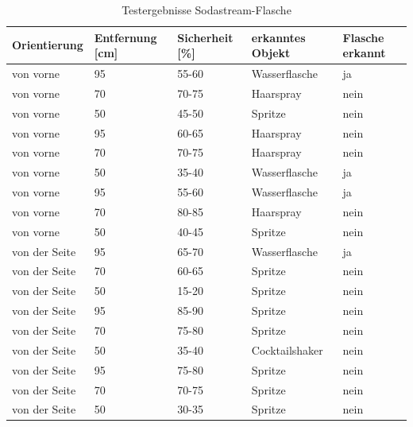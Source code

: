 \begin{table} [H]
	\centering
	\begin{tabular} {l l l l l}
		Orientierung & Entfernung [cm] & Sicherheit [\%] & erkanntes Objekt & Flasche erkannt\\ \hline
		von vorne&	95&	55-60&	Wasserflasche\cellcolor{green}&ja\cellcolor{green}\\
		von vorne&	70&	70-75&	Haarspray\cellcolor{red}&nein\cellcolor{red}\\
		von vorne&	50&	45-50&	Spritze\cellcolor{red}&nein\cellcolor{red}\\
		von vorne&	95&	60-65&	Haarspray\cellcolor{red}&nein\cellcolor{red}\\
		von vorne&	70&	70-75&	Haarspray\cellcolor{red}&nein\cellcolor{red}\\
		von vorne&	50&	35-40&	Wasserflasche\cellcolor{green}&ja\cellcolor{green}\\
		von vorne&	95&	55-60&	Wasserflasche\cellcolor{green}&ja\cellcolor{green}\\
		von vorne&	70&	80-85&	Haarspray\cellcolor{red}&nein\cellcolor{red}\\
		von vorne&	50&	40-45&	Spritze\cellcolor{red}&nein\cellcolor{red}\\ \hline
		von der Seite&	95&	65-70&	Wasserflasche\cellcolor{green}&ja\cellcolor{green}\\
		von der Seite&	70&	60-65&	Spritze\cellcolor{red}&nein\cellcolor{red}\\
		von der Seite&	50&	15-20&	Spritze\cellcolor{red}&nein\cellcolor{red}\\
		von der Seite&	95&	85-90&	Spritze\cellcolor{red}&nein\cellcolor{red}\\
		von der Seite&	70&	75-80&	Spritze\cellcolor{red}&nein\cellcolor{red}\\
		von der Seite&	50&	35-40&	Cocktailshaker\cellcolor{red}&nein\cellcolor{red}\\
		von der Seite&	95&	75-80&	Spritze\cellcolor{red}&nein\cellcolor{red}\\
		von der Seite&	70&	70-75&	Spritze\cellcolor{red}&nein\cellcolor{red}\\
		von der Seite&	50&	30-35&	Spritze\cellcolor{red}&nein\cellcolor{red}\\
	\end{tabular}
	\caption{Testergebnisse Sodastream-Flasche}
	\label{Sodastream}
\end{table}

